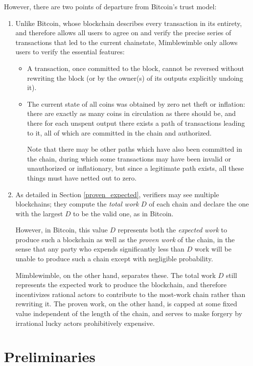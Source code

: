 \documentclass[letterpaper]{article}
\begin{document}
However, there are two points of departure from Bitcoin's trust model:
\begin{enumerate}
\item Unlike Bitcoin, whose blockchain describes every transaction in its
entirety, and therefore allows all users to agree on and verify the precise
series of transactions that led to the current chainstate, Mimblewimble
only allows users to verify the essential features:
\begin{itemize}
\item A transaction, once committed to the block, cannot be reversed
without rewriting the block (or by the owner(s) of its outputs explicitly
undoing it).
\item The current state of all coins was obtained by zero net theft or
inflation: there are exactly as many coins in circulation as there should
be, and there for each unspent output there exists a path of transactions
leading to it, all of which are committed in the chain and authorized.

Note that there may be other paths which have also been committed in the
chain, during which some transactions may have been invalid or unauthorized
or inflationary, but since a legitimate path exists, all these things must
have netted out to zero.
\end{itemize}

\item As detailed in Section \ref{proven_expected}, verifiers may see
multiple blockchains; they compute the \emph{total work} $D$ of each
chain and declare the one with the largest $D$ to be the valid one, as
in Bitcoin.

However, in Bitcoin, this value $D$ represents both the \emph{expected work}
to produce such a blockchain as well as the \emph{proven work} of the chain,
in the sense that any party who expends significantly less than $D$ work
will be unable to produce such a chain except with negligible probability.

Mimblewimble, on the other hand, separates these. The total work $D$ still
represents the expected work to produce the blockchain, and therefore
incentivizes rational actors to contribute to the most-work chain rather
than rewriting it. The proven work, on the other hand, is capped at some
fixed value independent of the length of the chain, and serves to make
forgery by irrational lucky actors prohibitively expensive.
\end{enumerate}


\section{Preliminaries}
\end{document}
